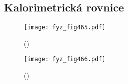      
      
      
      
    
    \subsection{Kalorimetrická rovnice}\label{fyz:IchapXLVsecIVssecII}
      
      

    \begin{figure}[ht!] %
      \centering
      \texttt{[image: fyz\_fig465.pdf]}
      \caption{ 
               (\cite[s.~707]{Feynman01})}
      \label{fyz:fig465}
    \end{figure}

    \begin{figure}[ht!] %
      \centering
      \texttt{[image: fyz\_fig466.pdf]}
      \caption{ 
               (\cite[s.~707]{Feynman01})}
      \label{fyz:fig466}
    \end{figure}
    
